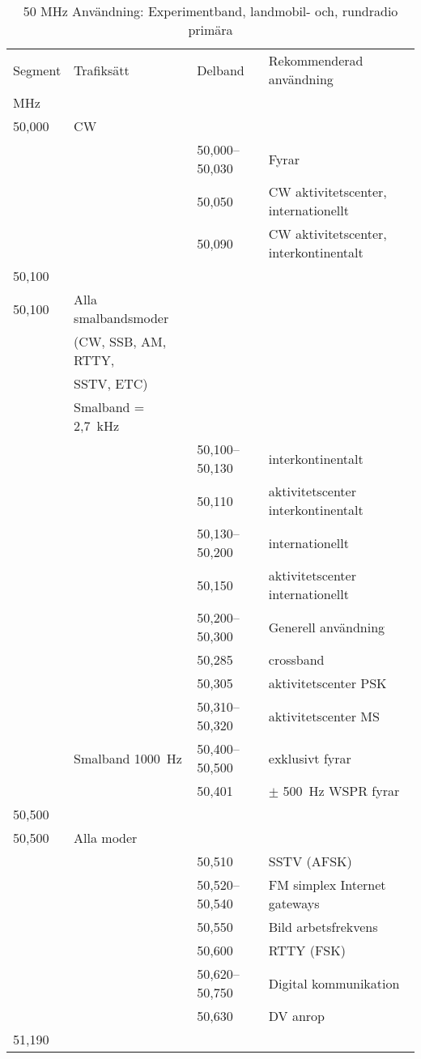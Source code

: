 \setlongtables
\begin{longtable}{llll}
\caption{50 MHz Användning: Experimentband, landmobil- och, rundradio primära}\\
Segment & Trafiksätt & Delband & Rekommenderad användning \\
MHz     &            &         & \\ \hline
\endhead
50,000 & CW &                 & \\
       &    & 50,000--50,030 & Fyrar\\
       &    & 50,050          & CW aktivitetscenter, internationellt\\
       &    & 50,090          & CW aktivitetscenter, interkontinentalt\\
50,100 &    &                 & \\ \hline

50,100 & Alla smalbandsmoder & &\\
       & (CW, SSB, AM, RTTY, & &\\
       & SSTV, ETC)          & &\\
       & Smalband = 2,7~kHz  & &\\
       & & 50,100--50,130 & interkontinentalt\\
       & & 50,110 & aktivitetscenter interkontinentalt\\
       & & 50,130--50,200 & internationellt\\
       & & 50,150 & aktivitetscenter internationellt\\
       & & 50,200--50,300 & Generell användning\\
       & & 50,285 & crossband\\
       & & 50,305 & aktivitetscenter PSK\\
       & & 50,310--50,320 & aktivitetscenter MS\\
       & Smalband 1000~Hz & 50,400--50,500 & exklusivt fyrar\\
       & & 50,401 & \(\pm\) 500~Hz WSPR fyrar\\
50,500 &    &                 & \\ \hline

50,500 & Alla moder & & \\
       & & 50,510 & SSTV (AFSK)\\
       & & 50,520--50,540 & FM simplex Internet gateways\\
       & & 50,550 & Bild arbetsfrekvens\\
       & & 50,600 & RTTY (FSK)\\
       & & 50,620--50,750 & Digital kommunikation\\
       & & 50,630 & DV anrop\\
51,190 &    &   & \\ \hline


\end{longtable}
